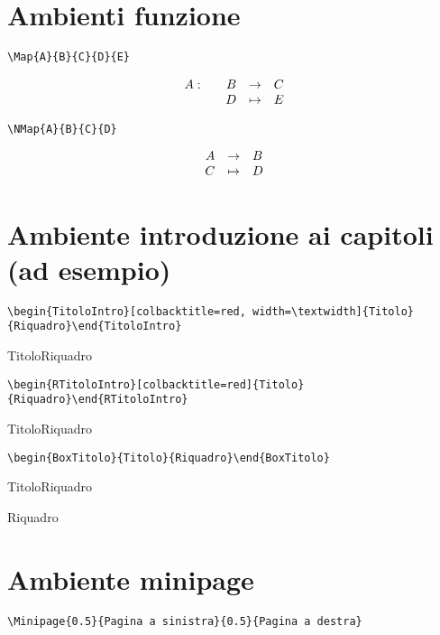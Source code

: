 \section{Ambienti funzione}	
\begin{verbatim}
\Map{A}{B}{C}{D}{E}
\end{verbatim}
$$\begin{array}{rrcl} A:\quad&B&\to&C\\ &D&\mapsto&E \end{array}$$

\begin{verbatim}
\NMap{A}{B}{C}{D}
\end{verbatim}
$$\begin{array}{rcl} A&\to & B\\ C&\mapsto & D \end{array}$$
\section{Ambiente introduzione ai capitoli (ad esempio)}
\begin{verbatim}
\begin{TitoloIntro}[colbacktitle=red, width=\textwidth]{Titolo}{Riquadro}\end{TitoloIntro}
\end{verbatim}
\begin{TitoloIntro}[colbacktitle=red, width=\textwidth]{Titolo}{Riquadro}\end{TitoloIntro}

\begin{verbatim}
\begin{RTitoloIntro}[colbacktitle=red]{Titolo}{Riquadro}\end{RTitoloIntro}
\end{verbatim}
\begin{RTitoloIntro}[colbacktitle=red]{Titolo}{Riquadro}\end{RTitoloIntro}

\begin{verbatim}
\begin{BoxTitolo}{Titolo}{Riquadro}\end{BoxTitolo}
\end{verbatim}
\begin{BoxTitolo}{Titolo}{Riquadro}\end{BoxTitolo}

\noindent
{}
\begin{Boxed}Riquadro\end{Boxed}
\section{Ambiente minipage}
\begin{verbatim}
\Minipage{0.5}{Pagina a sinistra}{0.5}{Pagina a destra}
\end{verbatim}
